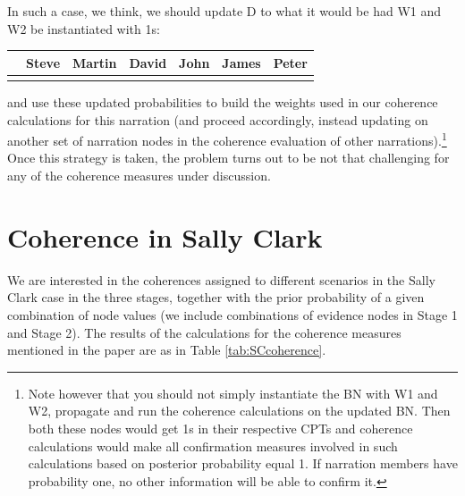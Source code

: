 \documentclass[10pt,]{scrartcl}
\begin{document}
In such a case, we think, we should update \textsf{D} to what it would
be had \textsf{W1} and \textsf{W2} be instantiated with 1s:

\begin{table}[H]
\centering
\begin{tabular}{lrrrrrr}
\toprule
  & Steve & Martin & David & John & James & Peter\\
\midrule
\cellcolor{gray!6}{Pr} & \cellcolor{gray!6}{0.981} & \cellcolor{gray!6}{0.004} & \cellcolor{gray!6}{0.004} & \cellcolor{gray!6}{0.004} & \cellcolor{gray!6}{0.004} & \cellcolor{gray!6}{0.004}\\
\bottomrule
\end{tabular}
\end{table}

\noindent and use these updated probabilities to build the weights used
in our coherence calculations for this narration (and proceed
accordingly, instead updating on another set of narration nodes in the
coherence evaluation of other
narrations).\footnote{Note  however that  you should not simply instantiate the BN with \textsf{W1} and \textsf{W2}, propagate and run the coherence calculations on the updated BN. Then both these nodes would get 1s in their respective CPTs and coherence calculations would make   all  confirmation measures involved in such calculations  based on posterior probability equal 1. If narration members have probability one, no other information will be able to confirm it.}
Once this strategy is taken, the problem turns out to be not that
challenging for any of the coherence measures under discussion.




\section{Coherence in Sally Clark}\label{sec:Sally}


We are interested in the coherences assigned to different scenarios in the Sally Clark case  in the three stages, together with the prior probability of a given combination of node values (we include combinations of evidence nodes in Stage 1 and Stage 2). The results of the calculations for the coherence measures mentioned in the paper are as in Table \ref{tab:SCcoherence}.
\end{document}
